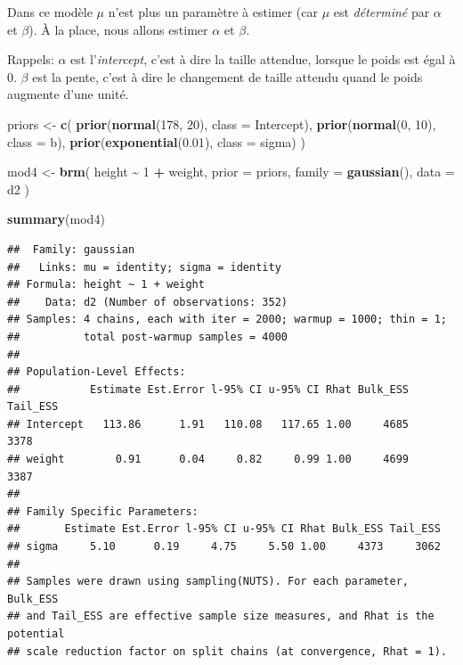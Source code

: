 \documentclass[
  a4paper,11pt,twoside,onecolumn,openright,final,oldfontcommands]{memoir}
\newenvironment{Shaded}{\begin{snugshade}}{\end{snugshade}}
\newcommand{\DataTypeTok}[1]{\textcolor[rgb]{0.13,0.29,0.53}{#1}}
\newcommand{\DecValTok}[1]{\textcolor[rgb]{0.00,0.00,0.81}{#1}}
\newcommand{\FloatTok}[1]{\textcolor[rgb]{0.00,0.00,0.81}{#1}}
\newcommand{\KeywordTok}[1]{\textcolor[rgb]{0.13,0.29,0.53}{\textbf{#1}}}
\newcommand{\NormalTok}[1]{#1}
\newcommand{\OperatorTok}[1]{\textcolor[rgb]{0.81,0.36,0.00}{\textbf{#1}}}
\newcommand{\StringTok}[1]{\textcolor[rgb]{0.31,0.60,0.02}{#1}}
\theoremstyle{definition}
\theoremstyle{definition}
\theoremstyle{definition}
\theoremstyle{remark}
\begin{document}
Dans ce modèle \(\mu\) n'est plus un paramètre à estimer (car \(\mu\) est \emph{déterminé} par \(\alpha\) et \(\beta\)). À la place, nous allons estimer \(\alpha\) et \(\beta\).

Rappels: \(\alpha\) est l'\emph{intercept}, c'est à dire la taille attendue, lorsque le poids est égal à \(0\). \(\beta\) est la pente, c'est à dire le changement de taille attendu quand le poids augmente d'une unité.

\begin{Shaded}
\begin{Highlighting}[]
\NormalTok{priors \textless{}{-}}\StringTok{ }\KeywordTok{c}\NormalTok{(}
  \KeywordTok{prior}\NormalTok{(}\KeywordTok{normal}\NormalTok{(}\DecValTok{178}\NormalTok{, }\DecValTok{20}\NormalTok{), }\DataTypeTok{class =}\NormalTok{ Intercept),}
  \KeywordTok{prior}\NormalTok{(}\KeywordTok{normal}\NormalTok{(}\DecValTok{0}\NormalTok{, }\DecValTok{10}\NormalTok{), }\DataTypeTok{class =}\NormalTok{ b),}
  \KeywordTok{prior}\NormalTok{(}\KeywordTok{exponential}\NormalTok{(}\FloatTok{0.01}\NormalTok{), }\DataTypeTok{class =}\NormalTok{ sigma)}
\NormalTok{  )}

\NormalTok{mod4 \textless{}{-}}\StringTok{ }\KeywordTok{brm}\NormalTok{(}
\NormalTok{  height }\OperatorTok{\textasciitilde{}}\StringTok{ }\DecValTok{1} \OperatorTok{+}\StringTok{ }\NormalTok{weight,}
  \DataTypeTok{prior =}\NormalTok{ priors,}
  \DataTypeTok{family =} \KeywordTok{gaussian}\NormalTok{(),}
  \DataTypeTok{data =}\NormalTok{ d2}
\NormalTok{  )}
\end{Highlighting}
\end{Shaded}

\begin{Shaded}
\begin{Highlighting}[]
\KeywordTok{summary}\NormalTok{(mod4)}
\end{Highlighting}
\end{Shaded}

\begin{verbatim}
##  Family: gaussian 
##   Links: mu = identity; sigma = identity 
## Formula: height ~ 1 + weight 
##    Data: d2 (Number of observations: 352) 
## Samples: 4 chains, each with iter = 2000; warmup = 1000; thin = 1;
##          total post-warmup samples = 4000
## 
## Population-Level Effects: 
##           Estimate Est.Error l-95% CI u-95% CI Rhat Bulk_ESS Tail_ESS
## Intercept   113.86      1.91   110.08   117.65 1.00     4685     3378
## weight        0.91      0.04     0.82     0.99 1.00     4699     3387
## 
## Family Specific Parameters: 
##       Estimate Est.Error l-95% CI u-95% CI Rhat Bulk_ESS Tail_ESS
## sigma     5.10      0.19     4.75     5.50 1.00     4373     3062
## 
## Samples were drawn using sampling(NUTS). For each parameter, Bulk_ESS
## and Tail_ESS are effective sample size measures, and Rhat is the potential
## scale reduction factor on split chains (at convergence, Rhat = 1).
\end{verbatim}
\end{document}
